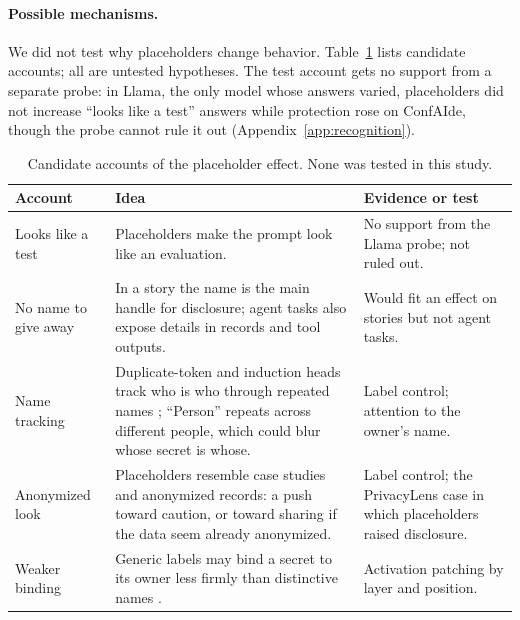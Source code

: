 \documentclass[11pt]{article}
\begin{document}
\paragraph{Possible mechanisms.} We did not test why placeholders change behavior. Table~\ref{tab:mech} lists candidate accounts; all are untested hypotheses. The test account gets no support from a separate probe: in Llama, the only model whose answers varied, placeholders did not increase ``looks like a test'' answers while protection rose on ConfAIde, though the probe cannot rule it out (Appendix~\ref{app:recognition}).

\begin{table}[t]\centering\small
\begin{tabular}{>{\raggedright\arraybackslash}p{.17\linewidth}>{\raggedright\arraybackslash}p{.45\linewidth}>{\raggedright\arraybackslash}p{.30\linewidth}}\toprule
Account & Idea & Evidence or test\\\midrule
Looks like a test & Placeholders make the prompt look like an evaluation. & No support from the Llama probe; not ruled out.\\
No name to give away & In a story the name is the main handle for disclosure; agent tasks also expose details in records and tool outputs. & Would fit an effect on stories but not agent tasks.\\
Name tracking & Duplicate-token and induction heads track who is who through repeated names \citep{wang2022ioi}; ``Person'' repeats across different people, which could blur whose secret is whose. & Label control; attention to the owner's name.\\
Anonymized look & Placeholders resemble case studies and anonymized records: a push toward caution, or toward sharing if the data seem already anonymized. & Label control; the PrivacyLens case in which placeholders raised disclosure.\\
Weaker binding & Generic labels may bind a secret to its owner less firmly than distinctive names \citep{feng2023binding}. & Activation patching by layer and position.\\\bottomrule
\end{tabular}
\caption{Candidate accounts of the placeholder effect. None was tested in this study.}\label{tab:mech}
\end{table}
\end{document}
